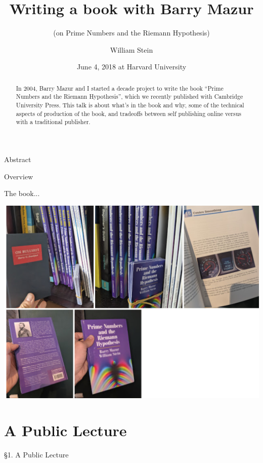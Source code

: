 \documentclass{beamer}
\title[Writing a book]{Writing a book with Barry Mazur}
\subtitle{(on Prime Numbers and the Riemann Hypothesis)}
\author[W.\thinspace{}Stein]{William Stein}
\date[Mazur 80]{June 4, 2018 at Harvard University}
\institute[SageMath, Inc. \& UW]{SageMath, Inc. and University of Washington}
\newcommand{\mysection}[2]{\section{#2}%
\begin{frame}{}
\vfill
\begin{center}
\Huge\sc \S#1. #2
\end{center}
\vfill
\end{frame}}
\begin{document}
\begin{frame}
  \titlepage
\end{frame}

\begin{frame}{Abstract}
  \begin{abstract}
    In 2004, Barry Mazur and I started a decade project to write the
    book ``Prime Numbers and the Riemann Hypothesis'', which we recently
    published with Cambridge University Press. This 
    talk is about
    what's in the book and why, some of the technical aspects
    of production of the book, and tradeoffs between
    self publishing online versus with a traditional publisher.
  \end{abstract}
\end{frame}

\begin{frame}{Overview}
  \tableofcontents
\end{frame}

\begin{frame}{The book...}
  \begin{center}
    \includegraphics[height=.82\textheight]{pics/the-book.png}
  \end{center}
\end{frame}

\mysection{1}{A Public Lecture}
\end{document}
